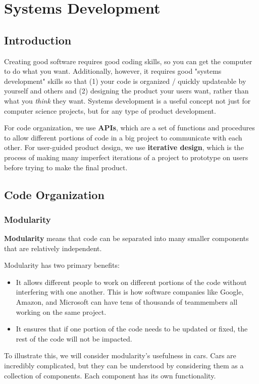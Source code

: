 \chapter{Systems Development}

\section{Introduction}
Creating good software requires good coding skills, so you can get the computer to do what you want. Additionally, however, it requires good "systems development" skills so that (1) your code is organized / quickly updateable by yourself and others and (2) designing the product your users want, rather than what you \emph{think} they want. Systems development is a useful concept not just for computer science projects, but for any type of product development. 

For code organization, we use \textbf{APIs}, which are a set of functions and procedures to allow different portions of code in a big project to communicate with each other. For user-guided product design, we use \textbf{iterative design}, which is the process of making many imperfect iterations of a project to prototype on users before trying to make the final product. 

\section{Code Organization}

 \subsection{Modularity}
 \textbf{Modularity} means that code can be separated into many smaller components that are relatively independent. 
 
Modularity has two primary benefits:
\begin{itemize}
\item It allows different people to work on different portions of the code without interfering with one another. This is how software companies like Google, Amazon, and Microsoft can have tens of thousands of teammembers all working on the same project.
\item It ensures that if one portion of the code needs to be updated or fixed, the rest of the code will not be impacted. 
\end{itemize} 

To illustrate this, we will consider modularity's usefulness in cars. Cars are incredibly complicated, but they can be understood by considering them as a collection of components. Each component has its own functionality. 

